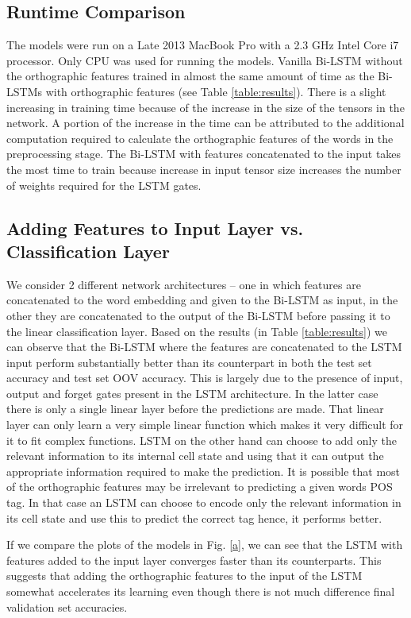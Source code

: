 \documentclass[11pt,letterpaper]{article}
\begin{document}
\subsection{Runtime Comparison}
The models were run on a Late 2013 MacBook Pro with a 2.3 GHz Intel Core i7 processor. Only CPU was used for running the models. Vanilla Bi-LSTM without the orthographic features trained in almost the same amount of time as the Bi-LSTMs with orthographic features (see Table \ref{table:results}). There is a slight increasing in training time because of the increase in the size of the tensors in the network. A portion of the increase in the time can be attributed to the additional computation required to calculate the orthographic features of the words in the preprocessing stage. The Bi-LSTM with features concatenated to the input takes the most time to train because increase in input tensor size increases the number of weights required for the LSTM gates.

\subsection{Adding Features to Input Layer vs. Classification Layer}
We consider 2 different network architectures -- one in which features are concatenated to the word embedding and given to the Bi-LSTM as input, in the other they are concatenated to the output of the Bi-LSTM before passing it to the linear classification layer. Based on the results (in Table \ref{table:results}) we can observe that the Bi-LSTM where the features are concatenated to the LSTM input perform substantially better than its counterpart in both the test set accuracy and test set OOV accuracy. This is largely due to the presence of input, output and forget gates present in the LSTM architecture. In the latter case there is only a single linear layer before the predictions are made. That linear layer can only learn a very simple linear function which makes it very difficult for it to fit complex functions. LSTM on the other hand can choose to add only the relevant information to its internal cell state and using that it can output the appropriate information required to make the prediction. It is possible that most of the orthographic features may be irrelevant to predicting a given words POS tag. In that case an LSTM can choose to encode only the relevant information in its cell state and use this to predict the correct tag hence, it performs better.

If we compare the plots of the models in Fig. \ref{a}, we can see that the LSTM with features added to the input layer converges faster than its counterparts. This suggests that adding the orthographic features to the input of the LSTM somewhat accelerates its learning even though there is not much difference final validation set accuracies.
\end{document}
